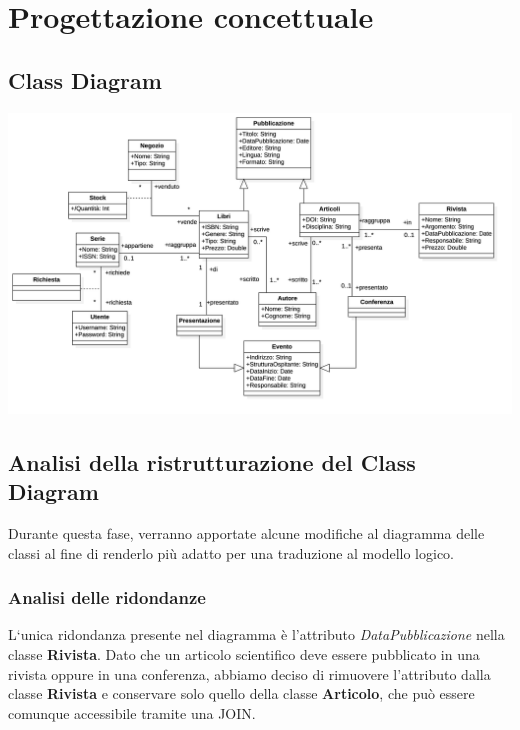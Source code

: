 \chapter{Progettazione concettuale}
    \section{Class Diagram}
    \includegraphics[scale=0.15]{Immagini/SchemaConcettuale.png}
    \section{Analisi della ristrutturazione del Class Diagram}
    Durante questa fase, verranno apportate alcune modifiche al diagramma delle 
    classi al fine di renderlo pi\`u adatto per una traduzione al modello logico.
        \subsection{Analisi delle ridondanze}
        L`unica ridondanza presente nel diagramma \`e l'attributo \textit{DataPubblicazione} nella 
        classe \textbf{Rivista}. Dato che un articolo scientifico deve essere pubblicato in una rivista oppure in una conferenza,
        abbiamo deciso di rimuovere l'attributo dalla classe \textbf{Rivista} e conservare solo quello della classe 
        \textbf{Articolo}, che pu\`o essere comunque accessibile tramite una JOIN.
